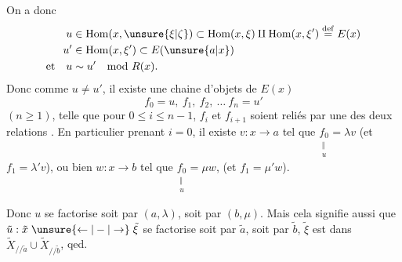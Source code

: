 On a donc
\[
\begin{aligned}
 u&\in\mathrm{Hom}(x,\unsure{\xi|\zeta})\subset\mathrm{Hom}(x,\xi)\amalg\mathrm{Hom}(x,\xi')\overset{\rm def}{=}E(x)\\
 u'&\in\mathrm{Hom}(x,\xi')\subset E(\unsure{a|x})\\
 \text{et}\quad u&\sim u'\quad\mathrm{mod}\ R(x).
\end{aligned}
\]
Donc  comme $u\ne u'$, il existe une chaine d'objets de $E(x)$
\[f_0=u,\ f_1,\ f_2,\ \ldots\ f_n=u'\]
$(n\geq1)$, telle que pour $0\leq i\leq n-1$, $f_i$ et $f_{i+1}$ soient reliés par une des deux relations . En particulier  prenant $i=0$, il existe $v:x\to a$ tel que $\underset{\substack{\Vert\\u}}{f_0}=\lambda v$ (et \deleted{\unsure{$\varnothing$}} $f_1=\lambda'v$), ou bien $w:x\to b$ tel que $\underset{\substack{\Vert\\u}}{f_0}=\mu w$, (et $f_1=\mu'w$).

Donc $u$ se factorise soit par $(a,\lambda)$, soit par $(b,\mu)$. Mais cela signifie aussi que $\tilde u:\tilde x\mathrel{\unsure{\leftarrow|-|\to}}\tilde\xi$ se factorise soit par $\tilde a$, soit par $\tilde b$,    $\tilde\xi$ est dans $\widetilde X_{//\tilde a}\cup\widetilde X_{//\tilde b}$,
qed.

